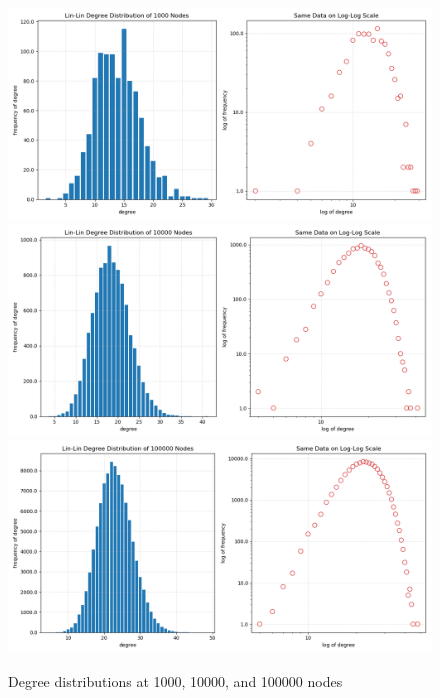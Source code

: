 \documentclass{article}
\begin{document}
    \begin{figure}[H]
        \centering
        \includegraphics[width=0.8\linewidth]{"../images/degree1000"}
        \includegraphics[width=0.8\linewidth]{"../images/degree10000"}
        \includegraphics[width=0.8\linewidth]{"../images/degree100000"}
        \caption{Degree distributions at 1000, 10000, and 100000 nodes}
    \end{figure}
\end{document}
